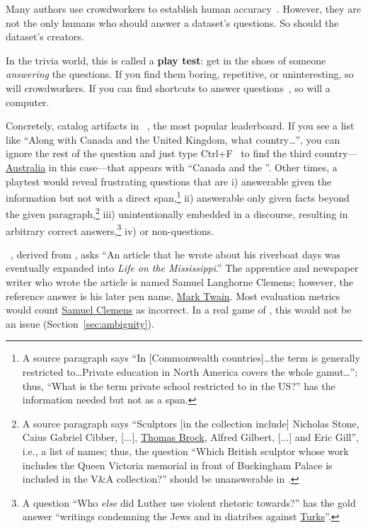 Many authors use crowdworkers to establish human accuracy~\cite{rajpurkar-16,choi-18}.  However, they are not the only humans who should answer a dataset's questions.  So should the dataset's creators.

In the trivia world, this is called a {\bf play test}:
get in the shoes of someone \emph{answering} the questions.
If you find them boring, repetitive, or uninteresting, so will
crowdworkers.
If you can find shortcuts to answer questions~\cite{rondeau-18,
  kaushik-18}, so will a computer.

Concretely,  catalog artifacts in \squad{}~\cite{rajpurkar-18}, the most popular  leaderboard.
If you see a list like ``Along with Canada and the United Kingdom, what country\dots'', you can ignore the rest of the question and just type Ctrl+F~\cite{yuan-19, russell-20} to find the third country---\underline{Australia} in this case---that appears with ``Canada and the ''.
Other times, a \squad{} playtest would reveal frustrating questions that are
i) answerable given the information but not with a direct span,\footnote{A source paragraph says ``In [Commonwealth countries]\dots the term is generally restricted to\dots Private education in North America covers the whole gamut\dots''; thus, ``What is the term private school restricted to in the US?'' has the information needed but not as a span.}
ii) answerable only given facts beyond the given paragraph,\footnote{A source paragraph says ``Sculptors [in the collection include] Nicholas Stone, Caius Gabriel Cibber, [...], \underline{Thomas Brock}, Alfred Gilbert, [...] and Eric Gill'', i.e., a list of names; thus, the question ``Which British sculptor whose work includes the Queen Victoria memorial in front of Buckingham Palace is included in the V\&A collection?'' should be unanswerable in \squad{}.}
iii) unintentionally embedded in a discourse, resulting
in arbitrary correct answers,\footnote{A question ``Who \emph{else} did Luther use violent rhetoric towards?'' has the gold answer ``writings condemning the Jews and in diatribes against \underline{Turks}''.}
iv)  or non-questions.

\searchqa{}~\cite{dunn-17}, derived from \jeopardy{}, asks ``An article that he wrote about his riverboat days was eventually expanded into \textit{Life on the Mississippi}.''
The apprentice and newspaper writer who wrote the article is named Samuel Langhorne Clemens; however, the reference answer is his later pen name, \underline{Mark Twain}.
Most \qa{} evaluation metrics would count \underline{Samuel Clemens} as incorrect.
In a real game of \jeopardy{}, this would not be an issue (Section~\ref{sec:ambiguity}).

